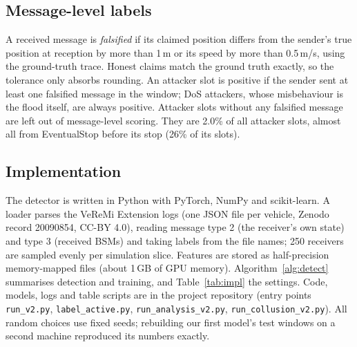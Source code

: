 \documentclass[conference]{IEEEtran}
\begin{document}
\subsection{Message-level labels}
\label{sec:labels}
A received message is \emph{falsified} if its claimed position differs from the sender's true position at reception by more than 1\,m or its
speed by more than 0.5\,m/s, using the ground-truth trace. Honest claims match the ground truth exactly, so the tolerance only absorbs
rounding. An attacker slot is positive if the sender sent at least one falsified message in the window; DoS attackers, whose misbehaviour is the flood
itself, are always positive. Attacker slots without any falsified message are left out of message-level scoring. They are 2.0\% of all attacker
slots, almost all from EventualStop before its stop (26\% of its slots).

\subsection{Implementation}
The detector is written in Python with PyTorch, NumPy and scikit-learn. A loader parses the VeReMi Extension logs (one JSON file per vehicle,
Zenodo record 20090854, CC-BY 4.0), reading message type 2 (the receiver's own state) and type 3 (received BSMs) and taking labels from the file
names; 250 receivers are sampled evenly per simulation slice. Features are stored as half-precision
memory-mapped files (about 1\,GB of GPU memory). Algorithm~\ref{alg:detect} summarises detection and training, and Table~\ref{tab:impl} the
settings. Code, models, logs and table scripts are in the project repository (entry points \texttt{run\_v2.py}, \texttt{label\_active.py},
\texttt{run\_analysis\_v2.py}, \texttt{run\_collusion\_v2.py}). All random choices use fixed seeds; rebuilding our first model's test windows on
a second machine reproduced its numbers exactly.


\end{document}
